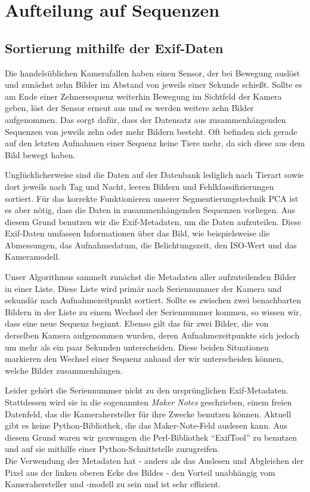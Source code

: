 \section{Aufteilung auf Sequenzen}

\subsection{Sortierung mithilfe der Exif-Daten}

Die handelsüblichen Kamerafallen haben einen Sensor, der bei Bewegung auslöst und zunächst zehn Bilder im Abstand von jeweils einer Sekunde schießt. Sollte es am Ende einer Zehnersequenz weiterhin Bewegung im Sichtfeld der Kamera geben, löst der Sensor erneut aus und es werden weitere zehn Bilder aufgenommen. Das sorgt dafür, dass der Datensatz aus zusammenhängenden Sequenzen von jeweils zehn oder mehr Bildern besteht. Oft befinden sich gerade auf den letzten Aufnahmen einer Sequenz keine Tiere mehr, da sich diese aus dem Bild bewegt haben. 

Unglücklicherweise sind die Daten auf der Datenbank lediglich nach Tierart sowie dort jeweils nach Tag und Nacht, leeren Bildern und Fehlklassifizierungen sortiert. Für das korrekte Funktionieren unserer Segmentierungstechnik PCA ist es aber nötig, dass die Daten in zusammenhängenden Sequenzen vorliegen. Aus diesem Grund benutzen wir die Exif-Metadaten, um die Daten aufzuteilen. Diese Exif-Daten umfassen Informationen über das Bild, wie beispielsweise die Abmessungen, das Aufnahmedatum, die Belichtungszeit, den ISO-Wert und das Kameramodell.

Unser Algorithmus sammelt zunächst die Metadaten aller aufzuteilenden Bilder in einer Liste. Diese Liste wird primär nach Seriennummer der Kamera und sekundär nach Aufnahmezeitpunkt sortiert. Sollte es zwischen zwei benachbarten Bildern in der Liste zu einem Wechsel der Seriennummer kommen, so wissen wir, dass eine neue Sequenz beginnt. Ebenso gilt das für zwei Bilder, die von derselben Kamera aufgenommen wurden, deren Aufnahmezeitpunkte sich jedoch um mehr als ein paar Sekunden unterscheiden. Diese beiden Situationen markieren den Wechsel einer Sequenz anhand der wir unterscheiden können, welche Bilder zusammenhängen.

Leider gehört die Seriennummer nicht zu den ursprünglichen Exif-Metadaten. Stattdessen wird sie in die sogenannten \emph{Maker Notes} geschrieben, einem freien Datenfeld, das die Kamerahersteller für ihre Zwecke benutzen können. Aktuell gibt es keine Python-Bibliothek, die das Maker-Note-Feld auslesen kann. Aus diesem Grund waren wir gezwungen die Perl-Bibliothek \enquote{ExifTool} \cite{exif} zu benutzen und auf sie mithilfe einer Python-Schnittstelle zuzugreifen. \\
Die Verwendung der Metadaten hat - anders als das Auslesen und Abgleichen der Pixel aus der linken oberen Ecke des Bildes - den Vorteil unabhängig vom Kamerahersteller und -modell zu sein und ist sehr effizient.

